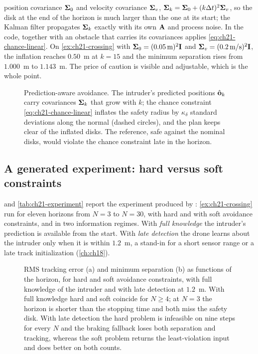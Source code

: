 position covariance $\mathbf{\Sigma}_0$ and velocity covariance $\mathbf{\Sigma}_v$,
$\mathbf{\Sigma}_k=\mathbf{\Sigma}_0+(k\Delta t)^2\mathbf{\Sigma}_v$, so the disk at the end of
the horizon is much larger than the one at its start; the Kalman filter
propagates $\mathbf{\Sigma}_k$ exactly with its own $\mathbf{A}$ and process noise.
In the code,  together with an obstacle that carries
its covariances applies \cref{eq:ch21-chance-linear}. On
\cref{ex:ch21-crossing} with $\mathbf{\Sigma}_0=(0.05\,\text{m})^2\mathbf{I}$ and
$\mathbf{\Sigma}_v=(0.2\,\text{m/s})^2\mathbf{I}$, the inflation reaches
$0.50$~m at $k=15$ and the minimum separation rises from $1.000$~m to
$1.143$~m. The price of caution is visible and adjustable, which is the whole
point.

\begin{figure}[tb]
  \centering
  \caption{Prediction-aware avoidance. The intruder's predicted positions
  $\hat{\mathbf{o}}_k$ carry covariances $\mathbf{\Sigma}_k$ that grow with $k$;
  the chance constraint \cref{eq:ch21-chance-linear} inflates the safety
  radius by $\kappa_\delta$ standard deviations along the normal (dashed
  circles), and the plan keeps clear of the inflated disks. The reference,
  safe against the nominal disks, would violate the chance constraint late in
  the horizon.}
  \label{fig:ch21-chance}
\end{figure}

\subsection{A generated experiment: hard versus soft constraints}
\label{sec:ch21-experiment}

 and \cref{tab:ch21-experiment} report the
experiment produced by : \cref{ex:ch21-crossing} run
for eleven horizons from $N=3$ to $N=30$, with hard and with soft avoidance
constraints, and in two information regimes. With \emph{full knowledge} the
intruder's prediction is available from the start. With \emph{late
detection} the drone learns about the intruder only when it is within
$1.2$~m, a stand-in for a short sensor range or a late track initialization
(\cref{ch:ch18}).

\begin{figure}[tb]
  \centering
  \caption{RMS tracking error (a) and minimum separation (b) as functions of
  the horizon, for hard and soft avoidance constraints, with full knowledge
  of the intruder and with late detection at $1.2$~m. With full knowledge hard
  and soft coincide for $N\ge4$; at $N=3$ the horizon is shorter than the
  stopping time and both miss the safety disk. With late detection the hard
  problem is infeasible on nine steps for every $N$ and the braking fallback
  loses both separation and tracking, whereas the soft problem returns the
  least-violation input and does better on both counts.}
  \label{fig:ch21-experiment}
\end{figure}

